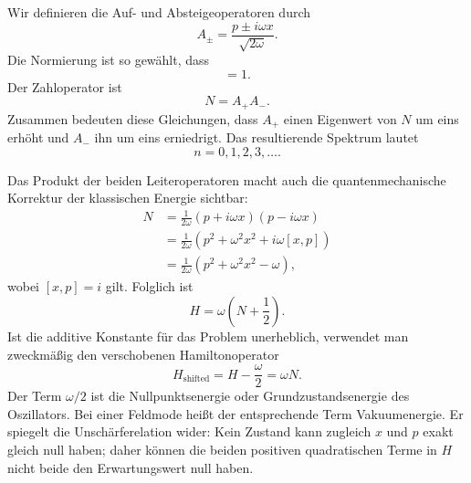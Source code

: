 Wir definieren die Auf- und Absteigeoperatoren durch
\begin{equation}
A_{\pm}=\frac{p\pm i\omega x}{\sqrt{2\omega}}.
\end{equation}
Die Normierung ist so gewählt, dass
\begin{equation}
[A_{-},A_{+}]=1.
\end{equation}
Der Zahloperator ist
\begin{equation}
N=A_{+}A_{-}.
\end{equation}
Zusammen bedeuten diese Gleichungen, dass \(A_{+}\) einen Eigenwert von \(N\) um eins erhöht und \(A_{-}\) ihn um eins erniedrigt. Das resultierende Spektrum lautet
\begin{equation}
n=0,1,2,3,\ldots .
\end{equation}

Das Produkt der beiden Leiteroperatoren macht auch die quantenmechanische Korrektur der klassischen Energie sichtbar:
\begin{align}
N
&=\frac{1}{2\omega}(p+i\omega x)(p-i\omega x)\\
&=\frac{1}{2\omega}\left(p^{2}+\omega^{2}x^{2}
 +i\omega[x,p]\right)\\
&=\frac{1}{2\omega}\left(p^{2}+\omega^{2}x^{2}-\omega\right),
\end{align}
wobei \([x,p]=i\) gilt. Folglich ist
\begin{equation}
H=\omega\left(N+\frac12\right).
\end{equation}
Ist die additive Konstante für das Problem unerheblich, verwendet man zweckmäßig den verschobenen Hamiltonoperator
\begin{equation}
H_{\mathrm{shifted}}=H-\frac{\omega}{2}=\omega N.
\end{equation}
Der Term \(\omega/2\) ist die Nullpunktsenergie oder Grundzustandsenergie des Oszillators. Bei einer Feldmode heißt der entsprechende Term Vakuumenergie. Er spiegelt die Unschärferelation wider: Kein Zustand kann zugleich \(x\) und \(p\) exakt gleich null haben; daher können die beiden positiven quadratischen Terme in \(H\) nicht beide den Erwartungswert null haben.

\begin{classroomqa}
\end{classroomqa}

